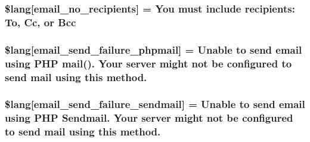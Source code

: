 \subsubsection[{\$lang}]{\setlength{\rightskip}{0pt plus 5cm}\$lang\mbox{[}\textquotesingle{}email\+\_\+no\+\_\+recipients\textquotesingle{}\mbox{]} = \textquotesingle{}You must include recipients\+: To, Cc, or Bcc\textquotesingle{}}\label{_admin_2system_2language_2english_2email__lang_8php_a8f9d5a049f4dd899d4e61f6d56be5071}
\hypertarget{_admin_2system_2language_2english_2email__lang_8php_a99a2ce89426340b4c96a245b7874a99d}{}
\subsubsection[{\$lang}]{\setlength{\rightskip}{0pt plus 5cm}\$lang\mbox{[}\textquotesingle{}email\+\_\+send\+\_\+failure\+\_\+phpmail\textquotesingle{}\mbox{]} = \textquotesingle{}Unable to send email using P\+H\+P mail(). Your server might not be configured to send mail using this method.\textquotesingle{}}\label{_admin_2system_2language_2english_2email__lang_8php_a99a2ce89426340b4c96a245b7874a99d}
\hypertarget{_admin_2system_2language_2english_2email__lang_8php_a0cfda188d86472ad2f3b96a67de75b4d}{}
\subsubsection[{\$lang}]{\setlength{\rightskip}{0pt plus 5cm}\$lang\mbox{[}\textquotesingle{}email\+\_\+send\+\_\+failure\+\_\+sendmail\textquotesingle{}\mbox{]} = \textquotesingle{}Unable to send email using P\+H\+P Sendmail. Your server might not be configured to send mail using this method.\textquotesingle{}}\label{_admin_2system_2language_2english_2email__lang_8php_a0cfda188d86472ad2f3b96a67de75b4d}
\hypertarget{_admin_2system_2language_2english_2email__lang_8php_a37e19fc7057ba5d5300dd3e83cefc5a2}{}
